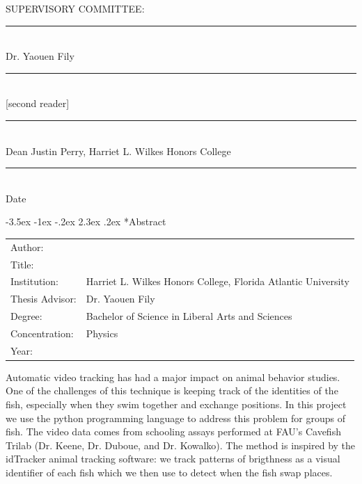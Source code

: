 \documentclass{article}
\makeatletter
\renewcommand\section{\clearpage\newpage\@startsection {section}{1}{\z@}%
	{-3.5ex \@plus -1ex \@minus -.2ex}%
	{2.3ex \@plus.2ex}%
	{\normalfont\Large\bfseries}}
\makeatother
\begin{document}
\vspace{1in}
SUPERVISORY COMMITTEE:

\newcommand{\myrule}{\vspace{0.5in}\rule{4in}{0.5pt} \\}

\myrule
Dr. Yaouen Fily 

\myrule 
{}[second reader]

\myrule
Dean Justin Perry, Harriet L. Wilkes Honors College 

\myrule
Date

\newpage


%
%


\section*{Abstract}

\myskip
\renewcommand{\arraystretch}{1.5}
\begin{tabular}{@{}l@{\hspace{3ex}}l}
	Author: & \myauthor \\
	Title: & \mytitle \\
	Institution: & Harriet L. Wilkes Honors College, Florida Atlantic University \\
	Thesis Advisor: & Dr. Yaouen Fily \\
	Degree: & Bachelor of Science in Liberal Arts and Sciences \\
	Concentration: & Physics \\
	Year: & \the\year
\end{tabular}

\myskip
\doublespace
Automatic video tracking has had a major impact on animal behavior studies. One of the challenges of this technique is keeping track of the identities of the fish, especially when they swim together and exchange positions. In this project we use the python programming language to address this problem for groups of fish. The video data comes from schooling assays performed at FAU's Cavefish Trilab (Dr. Keene, Dr. Duboue, and Dr. Kowalko). The method is inspired by the idTracker animal tracking software: we track patterns of brigthness as a visual identifier of each fish which we then use to detect when the fish swap places.
\newpage
\end{document}
